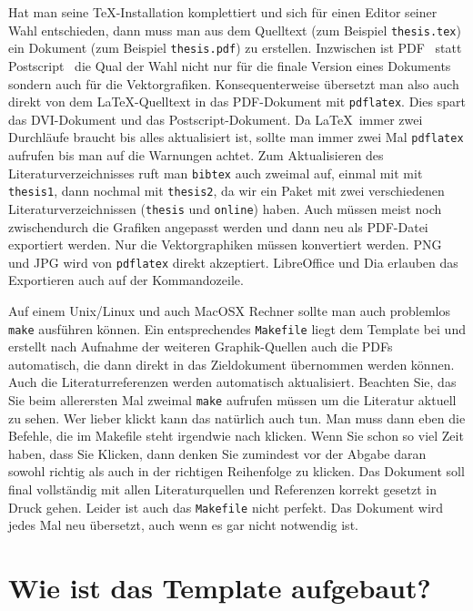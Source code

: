 \documentclass[11pt,a4paper]{report}
\begin{document}
Hat man seine \TeX-Installation komplettiert und sich für einen Editor seiner
Wahl entschieden, dann muss man aus dem Quelltext 
(zum Beispiel \verb|thesis.tex|) ein Dokument (zum Beispiel \verb|thesis.pdf|) 
zu erstellen.
Inzwischen ist PDF~\cite{pdf} statt Postscript~\cite{postscript} 
die Qual der Wahl nicht nur für die finale Version eines Dokuments 
sondern auch für die Vektorgrafiken.
Konsequenterweise übersetzt man also auch direkt von dem \LaTeX-Quelltext in 
das PDF-Dokument mit \verb|pdflatex|. 
Dies spart das DVI-Dokument und das Postscript-Dokument.
Da \LaTeX\ immer zwei Durchläufe braucht bis alles aktualisiert ist, sollte 
man immer zwei Mal \verb|pdflatex| aufrufen bis man auf die Warnungen achtet. 
Zum Aktualisieren des Literaturverzeichnisses ruft man \verb|bibtex| auch 
zweimal auf, einmal mit mit \verb|thesis1|, dann nochmal mit \verb|thesis2|, 
da wir ein Paket mit zwei verschiedenen Literaturverzeichnissen 
(\verb|thesis| und \verb|online|) haben.
Auch müssen meist noch zwischendurch die Grafiken angepasst werden und dann 
neu als PDF-Datei exportiert werden. 
Nur die Vektorgraphiken müssen konvertiert werden.
PNG und JPG wird von \verb|pdflatex| direkt akzeptiert.
LibreOffice und Dia erlauben das Exportieren auch auf der Kommandozeile.

Auf einem Unix/Linux und auch MacOSX Rechner sollte man auch problemlos 
\verb|make| ausführen können. 
Ein entsprechendes \verb|Makefile| liegt dem Template bei und erstellt nach 
Aufnahme der weiteren Graphik-Quellen auch die PDFs automatisch, die
dann direkt in das Zieldokument übernommen werden können.
Auch die Literaturreferenzen werden automatisch aktualisiert.
Beachten Sie, das Sie beim allerersten Mal zweimal \texttt{make}
aufrufen müssen um die Literatur aktuell zu sehen.
Wer lieber klickt kann das natürlich auch tun. Man muss dann
eben die Befehle, die im Makefile steht irgendwie nach klicken.
Wenn Sie schon so viel Zeit haben, dass Sie Klicken, dann denken
Sie zumindest vor der Abgabe daran sowohl richtig als auch in 
der richtigen Reihenfolge zu klicken.
Das Dokument soll final vollständig mit allen Literaturquellen und
Referenzen korrekt gesetzt in Druck gehen. 
Leider ist auch das \verb|Makefile| nicht perfekt. 
Das Dokument wird jedes Mal neu übersetzt, auch wenn es gar nicht
notwendig ist.

\section{Wie ist das Template aufgebaut?} \label{sec:template}
\end{document}
